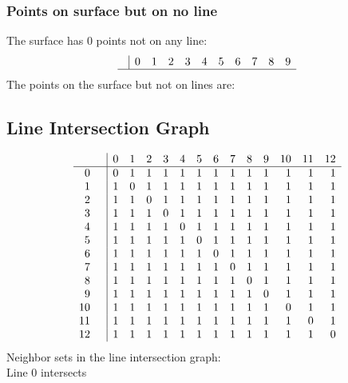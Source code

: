 \documentclass{article}
\begin{document}
{\subsubsection*{Points on surface but on no line}
The surface has 0 points not on any line:\\
$$
\begin{array}{r|*{10}{r}}
 & 0 & 1 & 2 & 3 & 4 & 5 & 6 & 7 & 8 & 9\\
\hline
\end{array}
$$
The points on the surface but not on lines are:\\
\begin{multicols}{2}
\noindent
\end{multicols}
\subsection*{Line Intersection Graph}
{\arraycolsep=1pt
$$
\begin{array}{rr|*{13}r}
 &  & 0 & 1 & 2 & 3 & 4 & 5 & 6 & 7 & 8 & 9 & 10 & 11 & 12\\
\hline
0 &  & 0 & 1 & 1 & 1 & 1 & 1 & 1 & 1 & 1 & 1 & 1 & 1 & 1\\
1 &  & 1 & 0 & 1 & 1 & 1 & 1 & 1 & 1 & 1 & 1 & 1 & 1 & 1\\
2 &  & 1 & 1 & 0 & 1 & 1 & 1 & 1 & 1 & 1 & 1 & 1 & 1 & 1\\
3 &  & 1 & 1 & 1 & 0 & 1 & 1 & 1 & 1 & 1 & 1 & 1 & 1 & 1\\
4 &  & 1 & 1 & 1 & 1 & 0 & 1 & 1 & 1 & 1 & 1 & 1 & 1 & 1\\
5 &  & 1 & 1 & 1 & 1 & 1 & 0 & 1 & 1 & 1 & 1 & 1 & 1 & 1\\
6 &  & 1 & 1 & 1 & 1 & 1 & 1 & 0 & 1 & 1 & 1 & 1 & 1 & 1\\
7 &  & 1 & 1 & 1 & 1 & 1 & 1 & 1 & 0 & 1 & 1 & 1 & 1 & 1\\
8 &  & 1 & 1 & 1 & 1 & 1 & 1 & 1 & 1 & 0 & 1 & 1 & 1 & 1\\
9 &  & 1 & 1 & 1 & 1 & 1 & 1 & 1 & 1 & 1 & 0 & 1 & 1 & 1\\
10 &  & 1 & 1 & 1 & 1 & 1 & 1 & 1 & 1 & 1 & 1 & 0 & 1 & 1\\
11 &  & 1 & 1 & 1 & 1 & 1 & 1 & 1 & 1 & 1 & 1 & 1 & 0 & 1\\
12 &  & 1 & 1 & 1 & 1 & 1 & 1 & 1 & 1 & 1 & 1 & 1 & 1 & 0\\
\end{array}
$$
}%
Neighbor sets in the line intersection graph:\\
Line 0 intersects 
$$
\begin{array}{|r*{12}{|c}|}

\end{array}$$}
\end{document}
